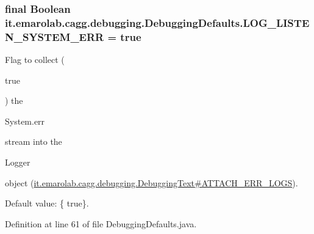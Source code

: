 \hypertarget{classit_1_1emarolab_1_1cagg_1_1debugging_1_1DebuggingDefaults_a99a53b1245a543cd658a05b4559a8902}{
\subsubsection[{L\-O\-G\-\_\-\-L\-I\-S\-T\-E\-N\-\_\-\-S\-Y\-S\-T\-E\-M\-\_\-\-E\-R\-R}]{\setlength{\rightskip}{0pt plus 5cm}final Boolean it.\-emarolab.\-cagg.\-debugging.\-Debugging\-Defaults.\-L\-O\-G\-\_\-\-L\-I\-S\-T\-E\-N\-\_\-\-S\-Y\-S\-T\-E\-M\-\_\-\-E\-R\-R = true\hspace{0.3cm}{\ttfamily [static]}}}\label{classit_1_1emarolab_1_1cagg_1_1debugging_1_1DebuggingDefaults_a99a53b1245a543cd658a05b4559a8902}
Flag to collect (
\begin{DoxyCode}
\textcolor{keyword}{true} 
\end{DoxyCode}
 ) the
\begin{DoxyCode}
System.err 
\end{DoxyCode}
 stream into the
\begin{DoxyCode}
Logger 
\end{DoxyCode}
 object (\hyperlink{}{it.\-emarolab.\-cagg.\-debugging.\-Debugging\-Text\#\-A\-T\-T\-A\-C\-H\-\_\-\-E\-R\-R\-\_\-\-L\-O\-G\-S}).\par
 Default value\-: \{ true\}. 

Definition at line 61 of file Debugging\-Defaults.\-java.

